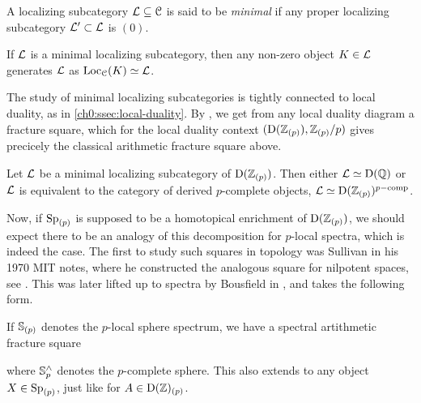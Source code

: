 \begin{definition}
    \label{ch0:def:minimal-localizing-subcategory}
    A localizing subcategory $\L\subseteq \C$ is said to be \emph{minimal} if any proper localizing subcategory $\L'\subset \L$ is $(0)$.  
\end{definition}

\begin{remark}
    If $\L$ is a minimal localizing subcategory, then any non-zero object $K\in \L$ generates $\L$ as $\Loc_\C(K)\simeq \L$.
\end{remark}

The study of minimal localizing subcategories is tightly connected to local duality, as in \cref{ch0:ssec:local-duality}. By \cite[2.26]{barthel-heard-valenzuela_2018}, we get from any local duality diagram a fracture square, which for the local duality context $(\Der(\Z_{(p)}), \Z_{(p)}/p)$ gives precicely the classical arithmetic fracture square above. 

\begin{proposition}
    Let $\L$ be a minimal localizing subcategory of $\Der(\Z_{(p)})$. Then either $\L \simeq \Der(\Q)$ or $\L$ is equivalent to the category of derived $p$-complete objects, $\L\simeq \Der(\Z_{(p)})^{p-\mathrm{comp}}$.
\end{proposition}

Now, if $\Sp_{(p)}$ is supposed to be a homotopical enrichment of $\Der(\Z_{(p)})$, we should expect there to be an analogy of this decomposition for $p$-local spectra, which is indeed the case. The first to study such squares in topology was Sullivan in his 1970 MIT notes, where he constructed the analogous square for nilpotent spaces, see \cite[3.20]{sullivan_05}. This was later lifted up to spectra by Bousfield in \cite[2.9]{bousfield_1979_localization}, and takes the following form. 

If $\S_{(p)}$ denotes the $p$-local sphere spectrum, we have a spectral artithmetic fracture square

\begin{center}
\end{center}

where $\S_p^\wedge$ denotes the $p$-complete sphere. This also extends to any object $X\in \Sp_{(p)}$, just like for $A\in \Der(\Z)_{(p)}$. 

